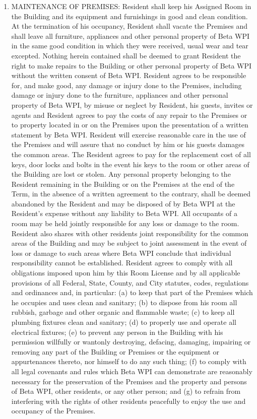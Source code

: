 \documentclass[legalpaper, 12pt]{article}
\begin{document}
\begin{enumerate}
\item\label{itm:maintenance}

MAINTENANCE OF PREMISES\@: Resident shall keep his Assigned Room in the Building and its equipment and furnishings in good and clean condition.
At the termination of his occupancy, Resident shall vacate the Premises and shall leave all furniture, appliances and other personal property of Beta WPI in the same good condition in which they were received, usual wear and tear excepted.
Nothing herein contained shall be deemed to grant Resident the right to make repairs to the Building or other personal property of Beta WPI without the written consent of Beta WPI\@.
Resident agrees to be responsible for, and make good, any damage or injury done to the Premises, including damage or injury done to the furniture, appliances and other personal property of Beta WPI, by misuse or neglect by Resident, his guests, invites or agents and Resident agrees to pay the costs of any repair to the Premises or to property located in or on the Premises upon the presentation of a written statement by Beta WPI\@.
Resident will exercise reasonable care in the use of the Premises and will assure that no conduct by him or his guests damages the common areas.
The Resident agrees to pay for the replacement cost of all keys, door locks and bolts in the event his keys to the room or other areas of the Building are lost or stolen.
Any personal property belonging to the Resident remaining in the Building or on the Premises at the end of the Term, in the absence of a written agreement to the contrary, shall be deemed abandoned by the Resident and may be disposed of by Beta WPI at the Resident’s expense without any liability to Beta WPI\@.
All occupants of a room may be held jointly responsible for any loss or damage to the room.
Resident also shares with other residents joint responsibility for the common areas of the Building and may be subject to joint assessment in the event of loss or damage to such areas where Beta WPI conclude that individual responsibility cannot be established.
Resident agrees to comply with all obligations imposed upon him by this Room License and by all applicable provisions of all Federal, State, County, and City statutes, codes, regulations and ordinances and, in particular: (a) to keep that part of the Premises which he occupies and uses clean and sanitary; (b) to dispose from his room all rubbish, garbage and other organic and flammable waste; (c) to keep all plumbing fixtures clean and sanitary; (d) to properly use and operate all electrical fixtures; (e) to prevent any person in the Building with his permission willfully or wantonly destroying, defacing, damaging, impairing or removing any part of the Building or Premises or the equipment or appurtenances thereto, nor himself to do any such thing; (f) to comply with all legal covenants and rules which Beta WPI can demonstrate are reasonably necessary for the preservation of the Premises and the property and persons of Beta WPI, other residents, or any other person; and (g) to refrain from interfering with the rights of other residents peacefully to enjoy the use and occupancy of the Premises.


\end{enumerate}
\end{document}
